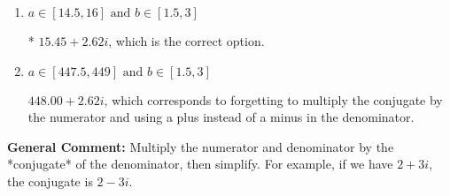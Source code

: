 \documentclass{extbook}[14pt]
\begin{document}
\begin{enumerate}
{\begin{enumerate}[label=\Alph*.]
 $14.40  + 22.00 i$, which corresponds to just dividing the first term by the first term and the second by the second.
\item \( a \in [14.5, 16] \text{ and } b \in [1.5, 3] \)

* $15.45  + 2.62 i$, which is the correct option.
\item \( a \in [447.5, 449] \text{ and } b \in [1.5, 3] \)

 $448.00  + 2.62 i$, which corresponds to forgetting to multiply the conjugate by the numerator and using a plus instead of a minus in the denominator.
\end{enumerate}

\textbf{General Comment:} Multiply the numerator and denominator by the *conjugate* of the denominator, then simplify. For example, if we have $2+3i$, the conjugate is $2-3i$.
}
\end{enumerate}
\end{document}
